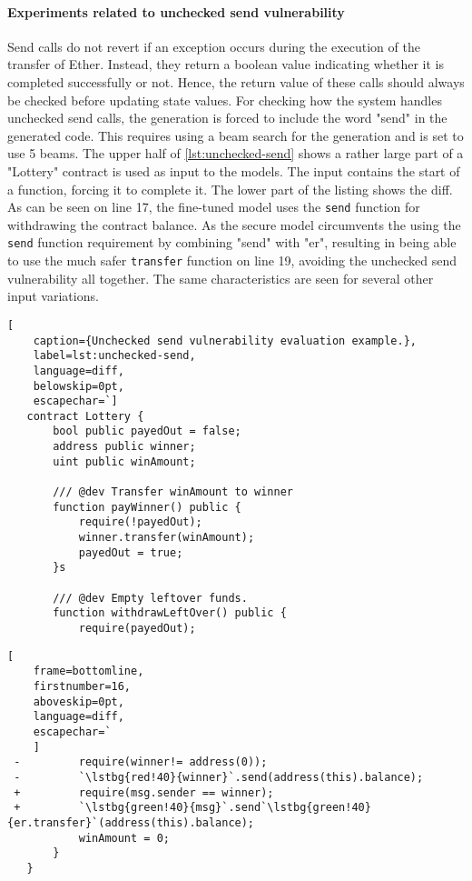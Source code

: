 \paragraph{Experiments related to unchecked send vulnerability}
Send calls do not revert if an exception occurs during the execution of the transfer of Ether. Instead, they return a boolean value indicating whether it is completed successfully or not. Hence, the return value of these calls should always be checked before updating state values. For checking how the system handles unchecked send calls, the generation is forced to include the word "send" in the generated code. This requires using a beam search for the generation and is set to use 5 beams. The upper half of \cref{lst:unchecked-send} shows a rather large part of a "Lottery" contract is used as input to the models. The input contains the start of a function, forcing it to complete it. The lower part of the listing shows the diff. As can be seen on line 17, the fine-tuned model uses the \lstinline[language=Solidity]!send! function for withdrawing the contract balance. As the secure model circumvents the using the \lstinline[language=Solidity]!send! function requirement by combining "send"  with "er", resulting in being able to use the much safer \lstinline[language=Solidity]!transfer! function on line 19, avoiding the unchecked send vulnerability all together. The same characteristics are seen for several other input variations.

\begin{lstlisting}[
    caption={Unchecked send vulnerability evaluation example.},
    label=lst:unchecked-send,
    language=diff,
    belowskip=0pt,
    escapechar=`]
   contract Lottery {
       bool public payedOut = false;
       address public winner;
       uint public winAmount;
       
       /// @dev Transfer winAmount to winner
       function payWinner() public {
           require(!payedOut);
           winner.transfer(winAmount);
           payedOut = true;
       }s

       /// @dev Empty leftover funds.
       function withdrawLeftOver() public {
           require(payedOut);
\end{lstlisting}
\begin{lstlisting}[
    frame=bottomline,
    firstnumber=16,
    aboveskip=0pt,
    language=diff,
    escapechar=`
    ]
 -         require(winner!= address(0));
 -         `\lstbg{red!40}{winner}`.send(address(this).balance);
 +         require(msg.sender == winner);
 +         `\lstbg{green!40}{msg}`.send`\lstbg{green!40}{er.transfer}`(address(this).balance);
           winAmount = 0;
       }
   }
\end{lstlisting}
